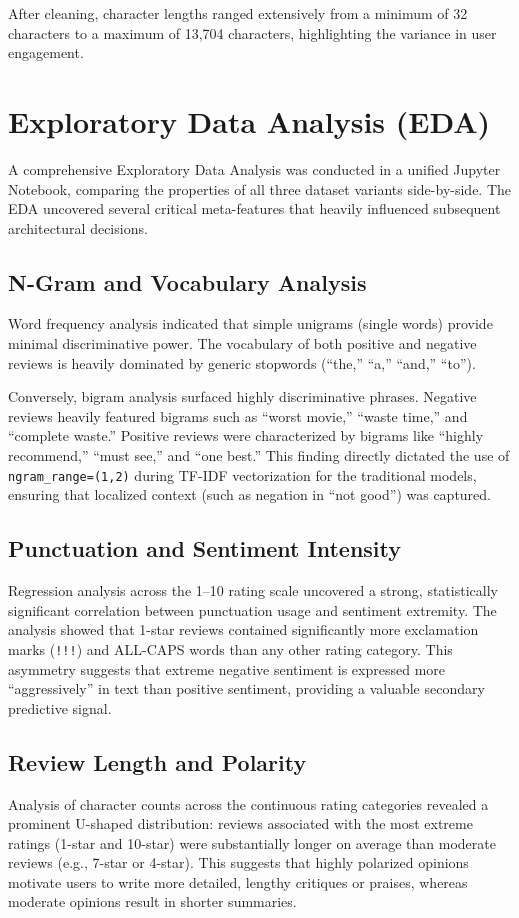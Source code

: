 \documentclass[conference]{IEEEtran}
\begin{document}
After cleaning, character lengths ranged extensively from a minimum of 32 characters to a maximum of 13,704 characters, highlighting the variance in user engagement.

\section{Exploratory Data Analysis (EDA)}
A comprehensive Exploratory Data Analysis was conducted in a unified Jupyter Notebook, comparing the properties of all three dataset variants side-by-side. The EDA uncovered several critical meta-features that heavily influenced subsequent architectural decisions.

\subsection{N-Gram and Vocabulary Analysis}
Word frequency analysis indicated that simple unigrams (single words) provide minimal discriminative power. The vocabulary of both positive and negative reviews is heavily dominated by generic stopwords (``the,'' ``a,'' ``and,'' ``to''). 

Conversely, bigram analysis surfaced highly discriminative phrases. Negative reviews heavily featured bigrams such as ``worst movie,'' ``waste time,'' and ``complete waste.'' Positive reviews were characterized by bigrams like ``highly recommend,'' ``must see,'' and ``one best.'' This finding directly dictated the use of \texttt{ngram\_range=(1,2)} during TF-IDF vectorization for the traditional models, ensuring that localized context (such as negation in ``not good'') was captured.

\subsection{Punctuation and Sentiment Intensity}
Regression analysis across the 1--10 rating scale uncovered a strong, statistically significant correlation between punctuation usage and sentiment extremity. The analysis showed that 1-star reviews contained significantly more exclamation marks (\texttt{!!!}) and ALL-CAPS words than any other rating category. This asymmetry suggests that extreme negative sentiment is expressed more ``aggressively'' in text than positive sentiment, providing a valuable secondary predictive signal.

\subsection{Review Length and Polarity}
Analysis of character counts across the continuous rating categories revealed a prominent U-shaped distribution: reviews associated with the most extreme ratings (1-star and 10-star) were substantially longer on average than moderate reviews (e.g., 7-star or 4-star). This suggests that highly polarized opinions motivate users to write more detailed, lengthy critiques or praises, whereas moderate opinions result in shorter summaries.
\end{document}
